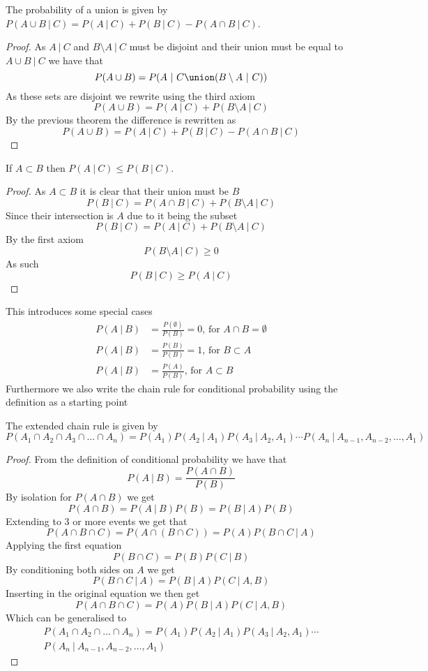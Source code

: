\begin{theorem}
  The probability of a union is given by $P(A\cup B~|~C)=P(A~|~C)+P(B~|~C)-P(A\cap B~|~C)$.
\end{theorem}
\begin{proof}
  As $A~|~C$ and $B\setminus A~|~C$ must be disjoint and their union must be equal to $A\cup B~|~C$ we have that
  \[
      P(A\cup B)=P(A~|~C\union (B\setminus A~|~C))
  \]
  As these sets are disjoint we rewrite using the third axiom
  \[
      P(A\cup B)=P(A~|~C)+P(B\setminus A~|~C)
  \]
  By the previous theorem the difference is rewritten as
  \[
      P(A\cup B)=P(A~|~C)+P(B~|~C)-P(A\cap B~|~C)
  \]
\end{proof}
\begin{theorem}
  If $A\subset B$ then $P(A~|~C)\leq P(B~|~C)$.
\end{theorem}
\begin{proof}
  As $A\subset B$ it is clear that their union must be $B$
  \[
      P(B~|~C)=P(A\cap B~|~C)+P(B\setminus A~|~C)
  \]
  Since their intersection is $A$ due to it being the subset
  \[
      P(B~|~C)=P(A~|~C)+P(B\setminus A~|~C)
  \]
  By the first axiom
  \[
      P(B\setminus A~|~C)\geq 0
  \]
  As such
  \[
      P(B~|~C)\geq P(A~|~C)
  \]
\end{proof}
This introduces some special cases
\begin{align*}
    P(A~|~B)&=\frac{P(\emptyset)}{P(B)}=0 \text{, for } A\cap B=\emptyset \\
    P(A~|~B)&=\frac{P(B)}{P(B)}=1 \text{, for } B\subset A \\
    P(A~|~B)&=\frac{P(A)}{P(B)} \text{, for } A\subset B
\end{align*}
Furthermore we also write the chain rule for conditional probability using the definition as a starting point
\begin{theorem}
  The extended chain rule is given by $P(A_{1}\cap A_{2}\cap A_{3}\cap\ldots\cap A_{n})=P(A_{1})P(A_{2}~|~A_{1})P(A_{3}~|~A_{2},A_{1})\cdots P(A_{n}~|~A_{n-1},A_{n-2},\ldots,A_{1})$
\end{theorem}
\begin{proof}
  From the definition of conditional probability we have that
  \[
      P(A~|~B)=\frac{P(A\cap B)}{P(B)}
  \]
  By isolation for $P(A\cap B)$ we get
  \[
      P(A\cap B)=P(A~|~B)P(B)=P(B~|~A)P(B)
  \]
  Extending to 3 or more events we get that
  \[
      P(A\cap B\cap C)=P(A\cap(B\cap C))=P(A)P(B\cap C~|~A)
  \]
  Applying the first equation
  \[
      P(B\cap C)=P(B)P(C~|~B)
  \]
  By conditioning both sides on $A$ we get
  \[
      P(B\cap C~|~A)=P(B~|~A)P(C~|~A,B)
  \]
  Inserting in the original equation we then get
  \[
      P(A\cap B\cap C)=P(A)P(B~|~A)P(C~|~A,B)
  \]
  Which can be generalised to
  \begin{equation*}
    \begin{gathered}
      P(A_{1}\cap A_{2}\cap\ldots\cap A_{n})=P(A_{1})P(A_{2}~|~A_{1})P(A_{3}~|~A_{2},A_{1})\cdots \\
      P(A_{n}~|~A_{n-1},A_{n-2},\ldots,A_{1})
    \end{gathered}
  \end{equation*}
\end{proof}
